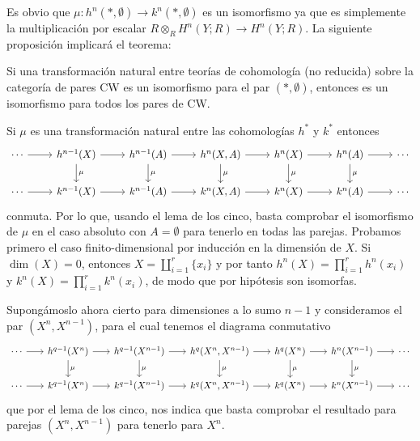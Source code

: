 \documentclass[TA.tex]{subfiles}
\begin{document}
Es obvio que $\mu:h^n(*,\emptyset)\to k^n(*,\emptyset)$ es un isomorfismo ya que es simplemente la multiplicación por escalar $R\otimes_R H^n(Y;R)\to H^n(Y;R)$. La siguiente proposición implicará el teorema:

\begin{prop}
Si una transformación natural entre teorías de cohomología (no reducida) sobre la categoría de pares CW es un isomorfismo para el par $(*,\emptyset)$, entonces es un isomorfismo para todos los pares de CW.
\end{prop}
\begin{dem}
Si $\mu$ es una transformación natural entre las cohomologías $h^*$ y $k^*$ entonces
\[
\begin{tikzcd}
\cdots \arrow[r] & h^{n-1}(X) \arrow[r] \arrow[d, "\mu"] & h^{n-1}(A) \arrow[r] \arrow[d, "\mu"] & {h^{n}(X,A)} \arrow[r] \arrow[d, "\mu"] & h^{n}(X) \arrow[d, "\mu"] \arrow[r] & h^{n}(A) \arrow[r] \arrow[d, "\mu"] & \cdots \\
\cdots \arrow[r] & k^{n-1}(X) \arrow[r] & k^{n-1}(A) \arrow[r] & {k^{n}(X,A)} \arrow[r] & k^{n}(X) \arrow[r] & k^{n}(A) \arrow[r] & \cdots
\end{tikzcd}
\]
conmuta. Por lo que, usando el lema de los cinco, basta comprobar el isomorfismo de $\mu$ en el caso absoluto con $A=\emptyset$ para tenerlo en todas las parejas. Probamos primero el caso finito-dimensional por inducción en la dimensión de $X$. Si $\dim(X)=0$, entonces $X=\coprod_{i=1}^r\{x_i\}$ y por tanto $h^n(X)=\prod_{i=1}^rh^n(x_i)$ y $k^n(X)=\prod_{i=1}^r k^n(x_i)$, de modo que por hipótesis son isomorfas. 

Supongámoslo ahora cierto para dimensiones a lo sumo $n-1$ y consideramos el par $(X^n,X^{n-1})$, para el cual tenemos el diagrama conmutativo
\[
\begin{tikzcd}[column sep=18]
\cdots \arrow[r] & h^{q-1}(X^n) \arrow[r] \arrow[d, "\mu"] & h^{q-1}(X^{n-1}) \arrow[r] \arrow[d, "\mu"] & {h^{q}(X^n,X^{n-1})} \arrow[r] \arrow[d, "\mu"] & h^{q}(X^n) \arrow[d, "\mu"] \arrow[r] & h^{n}(X^{n-1}) \arrow[r] \arrow[d, "\mu"] & \cdots \\
\cdots \arrow[r] & k^{q-1}(X^n) \arrow[r] & k^{q-1}(X^{n-1}) \arrow[r] & {k^{q}(X^n,X^{n-1})} \arrow[r] & k^{q}(X^n) \arrow[r] & k^{n}(X^{n-1}) \arrow[r] & \cdots
\end{tikzcd}
\]
que por el lema de los cinco, nos indica que basta comprobar el resultado para parejas $(X^n,X^{n-1})$ para tenerlo para $X^n$.


\end{dem}
\end{document}
